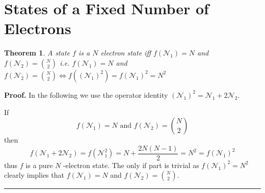\documentclass[aps,preprint]{revtex4}%
\newtheorem{theorem}{Theorem}
\newenvironment{proof}[1][Proof]{\noindent\textbf{#1.} }{\ \rule{0.5em}{0.5em}}
\begin{document}
\section{States of a Fixed Number of Electrons \label{Number}}

\begin{theorem}
A state $f$ is a $N$ electron state iff $f\left(  \mathcal{N}_{1}\right)  =N$
and $f\left(  \mathcal{N}_{2}\right)  =\binom{N}{2}$ i.e. $f\left(
\mathcal{N}_{1}\right)  =N$ and $f\left(  \mathcal{N}_{2}\right)  =\binom
{N}{2}\Leftrightarrow f\left(  \left(  \mathcal{N}_{1}\right)  ^{2}\right)
=f\left(  \mathcal{N}_{1}\right)  ^{2}=N^{2}$
\end{theorem}

\begin{proof}
In the following we use the operator identity $\left(  \mathcal{N}_{1}\right)
^{2}=\mathcal{N}_{1}+2\mathcal{N}_{2}.$

If
\begin{equation}
f\left(  \mathcal{N}_{1}\right)  =N\text{ and }f\left(  \mathcal{N}%
_{2}\right)  =\binom{N}{2}%
\end{equation}
then%
\begin{equation}
f\left(  \mathcal{N}_{1}+2\mathcal{N}_{2}\right)  =f\left(  \mathcal{N}%
_{1}^{2}\right)  =N+\frac{2N\left(  N-1\right)  }{2}=N^{2}=f\left(
\mathcal{N}_{1}\right)  ^{2}%
\end{equation}
thus $f$ is a pure $N$ -electron state. The only if part is trivial as
$f\left(  \mathcal{N}_{1}\right)  ^{2}=N^{2}$ clearly implies that $f\left(
\mathcal{N}_{1}\right)  =N$ and $f\left(  \mathcal{N}_{2}\right)  =\binom
{N}{2}.$
\end{proof}



\end{document}
